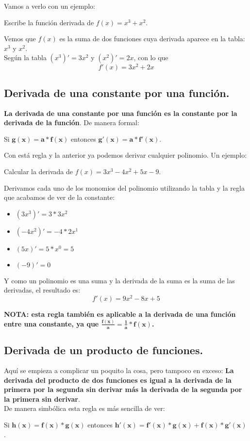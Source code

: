 \documentclass[a4paper,11pt,answers]{exam}
\begin{document}
Vamos a verlo con un ejemplo:
\begin{questions}
\question Escribe la función derivada de $f(x) = x^3 + x^2$.
\begin{solution}
Vemos que $f(x)$ es la suma de dos funciones cuya derivada aparece en la tabla: $x^3$ y $x^2$.\\

Según la tabla $(x^3)' = 3x^2$ y $(x^2)' = 2x$, con lo que
\[f'(x) = 3x^2 + 2x\]
\end{solution}
\end{questions}

\subsection{Derivada de una constante por una función.}
\textbf{La derivada de una constante por una función es la constante por la derivada de la función}. De manera formal:
\begin{center}
Si $\boldsymbol{g(x) = a*f(x)}$ entonces $\boldsymbol{g'(x) = a*f'(x)}$.
\end{center}

Con está regla y la anterior ya podemos derivar cualquier polinomio. Un ejemplo:
\begin{questions}
\question Calcular la derivada de $f(x) = 3x^3 - 4x^2 + 5 x -9$.
\begin{solution}
Derivamos cada uno de los monomios del polinomio utilizando la tabla y la regla que acabamos de ver de la constante:
\begin{itemize}
	\item $(3x^3)' = 3 * 3x^2$
	\item $(-4x^2)' = -4 * 2x^1$
	\item $(5x)' = 5*x^0 = 5$
	\item $(-9)' = 0$
\end{itemize}
Y como un polinomio es una suma y la derivada de la suma es la suma de las derivadas, el resultado es:
\[f'(x) = 9x^2 -8x+ 5\]
\end{solution}
\end{questions}
\textbf{NOTA: esta regla también es aplicable a la derivada de una función entre una constante, ya que $\boldsymbol{\frac{f(x)}{a} = \frac{1}{a}*f(x)}$.}
\subsection{Derivada de un producto de funciones.}
Aquí se empieza a complicar un poquito la cosa, pero tampoco en exceso: \textbf{La derivada del producto de dos funciones es igual a la derivada de la primera por la segunda sin derivar más la derivada de la segunda por la primera sin derivar}.\\
De manera simbólica esta regla es más sencilla de ver:
\begin{center}
Si $\boldsymbol{h(x) = f(x) *g(x)}$ entonces $\boldsymbol{h'(x) = f'(x)*g(x) + f(x) * g'(x)}$.
\end{center}
\end{document}
